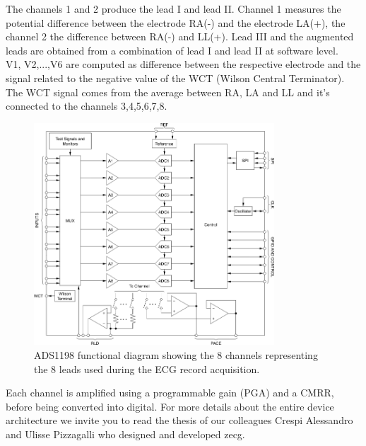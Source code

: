 The channels 1 and 2 produce the lead I and lead II. Channel 1 measures the potential difference between the electrode RA(-) and the electrode LA(+), the channel 2 the difference between RA(-) and LL(+). Lead III and the augmented leads are obtained from a combination of lead I and lead II at software level.\\
V1, V2,...,V6 are computed as difference between the respective electrode and the signal related to the negative value of the WCT (Wilson Central Terminator).\\
The WCT signal comes from the average between RA, LA and LL and it's connected to the channels 3,4,5,6,7,8.
\begin{figure}[ht!]
	\centering
	\includegraphics[width=90mm]{figures/ch8/2.png}
	\caption{ADS1198 functional diagram showing the 8 channels representing the 8 leads used during the ECG record acquisition.}
	\label{fig8.2}
\end{figure}
Each channel is amplified using a programmable gain (PGA) and a CMRR, before being converted into digital. For more details about the entire device architecture we invite you to read the thesis of our colleagues Crespi Alessandro and Ulisse Pizzagalli\cite{ref22} who designed and developed zecg.
